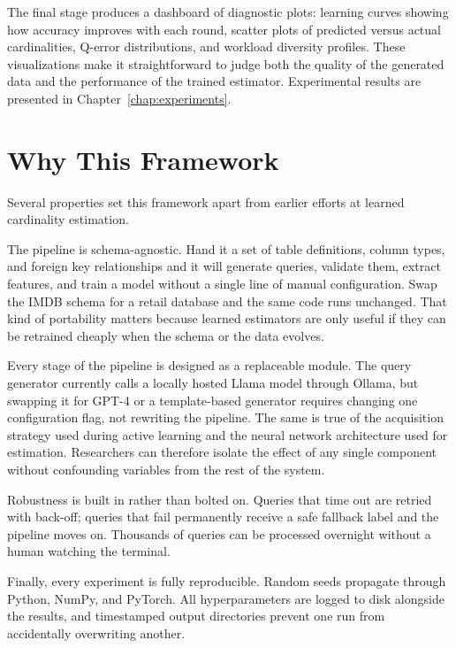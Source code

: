 The final stage produces a dashboard of diagnostic plots: learning curves showing how accuracy improves with each round, scatter plots of predicted versus actual cardinalities, Q-error distributions, and workload diversity profiles. These visualizations make it straightforward to judge both the quality of the generated data and the performance of the trained estimator. Experimental results are presented in Chapter~\ref{chap:experiments}.


\section{Why This Framework}

Several properties set this framework apart from earlier efforts at learned cardinality estimation.

The pipeline is schema-agnostic. Hand it a set of table definitions, column types, and foreign key relationships and it will generate queries, validate them, extract features, and train a model without a single line of manual configuration. Swap the IMDB schema for a retail database and the same code runs unchanged. That kind of portability matters because learned estimators are only useful if they can be retrained cheaply when the schema or the data evolves.

Every stage of the pipeline is designed as a replaceable module. The query generator currently calls a locally hosted Llama model through Ollama, but swapping it for GPT-4 or a template-based generator requires changing one configuration flag, not rewriting the pipeline. The same is true of the acquisition strategy used during active learning and the neural network architecture used for estimation. Researchers can therefore isolate the effect of any single component without confounding variables from the rest of the system.

Robustness is built in rather than bolted on. Queries that time out are retried with back-off; queries that fail permanently receive a safe fallback label and the pipeline moves on. Thousands of queries can be processed overnight without a human watching the terminal.

Finally, every experiment is fully reproducible. Random seeds propagate through Python, NumPy, and PyTorch. All hyperparameters are logged to disk alongside the results, and timestamped output directories prevent one run from accidentally overwriting another.